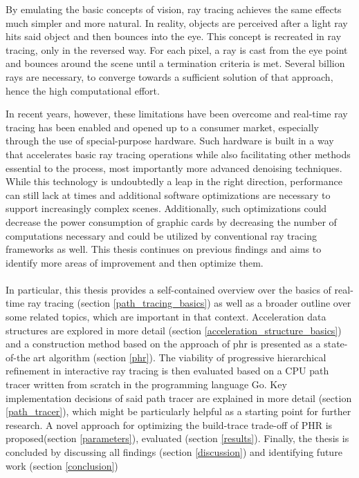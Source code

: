 By emulating the basic concepts of vision, ray tracing achieves the same effects much simpler and more natural. In reality, objects are perceived after a light ray hits said object and then bounces into the eye. This concept is recreated in ray tracing, only in the reversed way. For each pixel, a ray is cast from the eye point and bounces around the scene until a termination criteria is met. Several billion rays are necessary, to converge towards a sufficient solution of that approach, hence the high computational effort. 

In recent years, however, these limitations have been overcome and real-time ray tracing has been enabled and opened up to a consumer market, especially through the use of special-purpose hardware. Such hardware\cite{nvidia2017turing} is built in a way that accelerates basic ray tracing operations while also facilitating other methods essential to the process, most importantly more advanced denoising techniques. While this technology is undoubtedly a leap in the right direction, performance can still lack at times and additional software optimizations are necessary to support increasingly complex scenes. Additionally, such optimizations could decrease the power consumption of graphic cards by decreasing the number of computations necessary and could be utilized by conventional ray tracing frameworks as well. This thesis continues on previous findings and aims to identify more areas of improvement and then optimize them.
\\\\
In particular, this thesis provides a self-contained overview over the basics of real-time ray tracing (section \ref{path_tracing_basics}) as well as a broader outline over some related topics, which are important in that context. Acceleration data structures are explored in more detail (section \ref{acceleration_structure_basics}) and a construction method based on the approach of \acrfull{phr}\cite{hendrich_parallel_2017} is presented as a state-of-the art algorithm (section \ref{phr}). The viability of progressive hierarchical refinement in interactive ray tracing is then evaluated based on a CPU path tracer written from scratch in the programming language Go. Key implementation decisions of said path tracer are explained in more detail (section \ref{path_tracer}), which might be particularly helpful as a starting point for further research. A novel approach for optimizing the build-trace trade-off of PHR is proposed(section \ref{parameters}), evaluated (section \ref{results}). Finally, the thesis is concluded by discussing all findings (section \ref{discussion}) and identifying future work (section \ref{conclusion})
\cleardoublepage